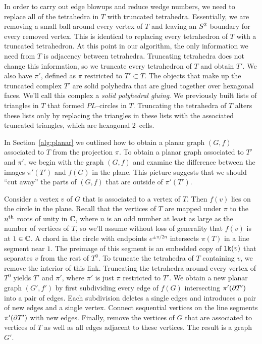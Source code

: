 In order to carry out edge blowups and reduce wedge numbers, we need to replace all of the tetrahedra in $T$ with truncated tetrahedra.
Essentially, we are removing a small ball around every vertex of $T$ and leaving an $S^2$ boundary for every removed vertex.
This is identical to replacing every tetrahedron of $T$ with a truncated tetrahedron.
At this point in our algorithm, the only information we need from $T$ is adjacency between tetrahedra.
Truncating tetrahedra does not change this information, so we truncate every tetrahedron of $T$ and obtain $T'$.
We also have $\pi'$, defined as $\pi$ restricted to $T'\subset T$.
The objects that make up the truncated complex $T'$ are solid polyhedra that are glued together over hexagonal faces.
We'll call this complex a \emph{solid polyhedral gluing}.
We previously built lists of triangles in $T$ that formed $PL$--circles in $T$.
Truncating the tetrahedra of $T$ alters these lists only by replacing the triangles in these lists with the associated truncated triangles, which are hexagonal 2--cells.

In Section~\ref{alg:planar} we outlined how to obtain a planar graph $(G,f)$ associated to $T$ from the projection $\pi$.
To obtain a planar graph associated to $T'$ and $\pi'$, we begin with the graph $(G,f)$ and examine the difference between the images $\pi'(T')$ and $f(G)$ in the plane.
This picture suggests that we should ``cut away'' the parts of $(G,f)$ that are outside of $\pi'(T')$.

Consider a vertex $v$ of $G$ that is associated to a vertex of $T$.
Then $f(v)$ lies on the circle in the plane.
Recall that the vertices of $T$ are mapped under $\pi$ to the $n^{\text{th}}$ roots of unity in $\mathbb{C}$, where $n$ is an odd number at least as large as the number of vertices of $T$, so we'll assume without loss of generality that $f(v)$ is at $1\in\mathbb{C}$.
A chord in the circle with endpoints $e^{\pm\pi/2n}$ intersects $\pi(T)$ in a line segment near $1$.
The preimage of this segment is an embedded copy of $\texttt{lk}(v)$ that separates $v$ from the rest of $T^0$.
To truncate the tetrahedra of $T$ containing $v$, we remove the interior of this link.
Truncating the tetrahedra around every vertex of $T^0$ yields $T'$ and $\pi'$, where $\pi'$ is just $\pi$ restricted to $T'$.
We obtain a new planar graph $(G',f')$ by first subdividing every edge of $f(G)$ intersecting $\pi'(\partial T')$ into a pair of edges.
Each subdivision deletes a single edges and introduces a pair of new edges and a single vertex.
Connect sequential vertices on the line segments $\pi'(\partial T')$ with new edges.
Finally, remove the vertices of $G$ that are associated to vertices of $T$ as well as all edges adjacent to these vertices.
The result is a graph $G'$.

